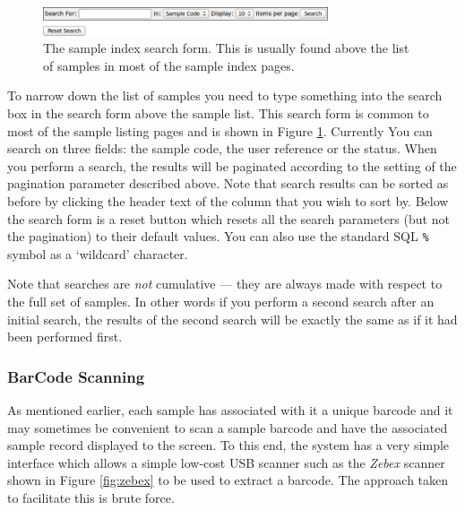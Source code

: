 \documentclass[12pt,twoside]{article}
\begin{document}
\begin{figure}[!htb]
\begin{center}
\includegraphics[width=0.75\textwidth]{searchform}
\caption{The sample index search form. This is usually found
above the list of samples in most of the sample index pages.
\label{fig:searchform}}
\end{center}
\end{figure}

To narrow down the list of samples you need to type something into
the search box in the search form above the sample list. This search form
is common to most of the sample listing pages and is shown in
Figure \ref{fig:searchform}.
Currently You can search on three fields: 
the sample code, the user reference or the status. When you perform
a search, the results will be paginated according to the setting of the
pagination parameter described above. Note that search results can be
sorted as before by clicking the header text of the column that you
wish to sort by.
Below the search form is a reset button which resets all the search
parameters (but not the pagination) to their default values.
You can also use the standard SQL \verb=%= symbol as a `wildcard'
character.

\begin{plainblock}
Note that searches are \emph{not} cumulative --- they are always made
with respect to the full set of samples. In other words if you perform
a second search after an initial search, the results of the second search
will be exactly the same as if it had been performed first.
\end{plainblock}

\subsubsection{BarCode Scanning}
As mentioned earlier, each sample has associated with it a unique
barcode and it may sometimes be convenient to scan a sample barcode
and have the associated sample record displayed to the screen.
To this end, the system has a very simple interface which allows
a simple low-cost USB scanner such as the \emph{Zebex} scanner shown in 
Figure \ref{fig:zebex} to be used to extract a barcode.
The approach taken to facilitate this is brute force.
\end{document}
